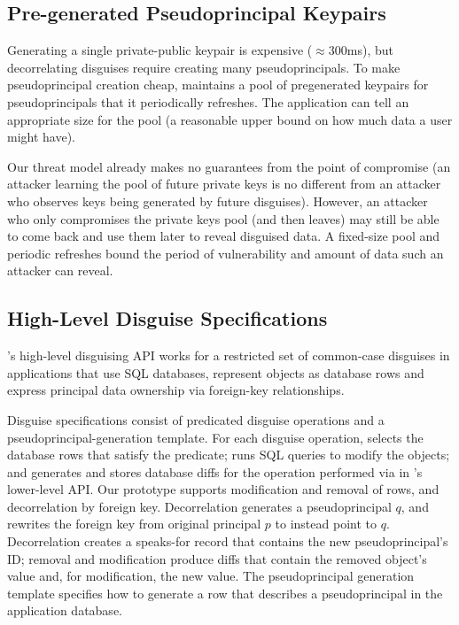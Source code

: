 \subsection{Pre-generated Pseudoprincipal Keypairs}
%
Generating a single private-public keypair is expensive ($\approx$300ms), but
decorrelating disguises require creating many pseudoprincipals.
%
To make pseudoprincipal creation cheap, \sys maintains a pool of
pregenerated keypairs for pseudoprincipals that it periodically refreshes.
%
The application can tell \sys an appropriate size for the pool (\eg a reasonable
upper bound on how much data a user might have).
%

%
Our threat model already makes no guarantees from the point of compromise (an attacker learning the
pool of future private keys is no different from an attacker who observes keys being generated by
future disguises). However, an attacker who only compromises the private keys pool (and then leaves)
may still be able to come back and use them later to reveal disguised data.
A fixed-size pool and periodic refreshes bound the period of vulnerability and amount of data such
an attacker can reveal. 
%

\subsection{High-Level Disguise Specifications}
%
\sys's high-level disguising API works for a restricted set of common-case
disguises in applications that use SQL databases, represent objects as
database rows and express principal data ownership via foreign-key
relationships.
%

%
Disguise specifications consist of predicated disguise operations
and a pseudoprincipal-generation template.
%
For each disguise operation, \sys selects the database rows that satisfy
the predicate; runs SQL queries to modify the objects; and generates and
stores database diffs for the operation performed via  in
\sys's lower-level API.
%
Our prototype supports modification and removal of rows, and decorrelation
by foreign key.
%
Decorrelation generates a pseudoprincipal $q$, and rewrites the foreign
key from original principal $p$ to instead point to $q$.
%
Decorrelation creates a speaks-for record that contains the new
pseudoprincipal's ID; removal and modification produce diffs that contain
the removed object's value and, for modification, the new value.
%
The pseudoprincipal generation template specifies how to generate a row
that describes a pseudoprincipal in the application database.
%

